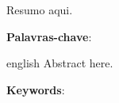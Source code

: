 

\begin{resumo}
    Resumo aqui.
    
    \vspace{\onelineskip}
    \noindent    
    \textbf{Palavras-chave}: \palavraschave
\end{resumo}

 \begin{resumo}[Abstract]
     \begin{otherlanguage*}{english}
         Abstract here.
     
         \vspace{\onelineskip}
         \noindent
         \textbf{Keywords}: \keywords
     \end{otherlanguage*}
 \end{resumo}


